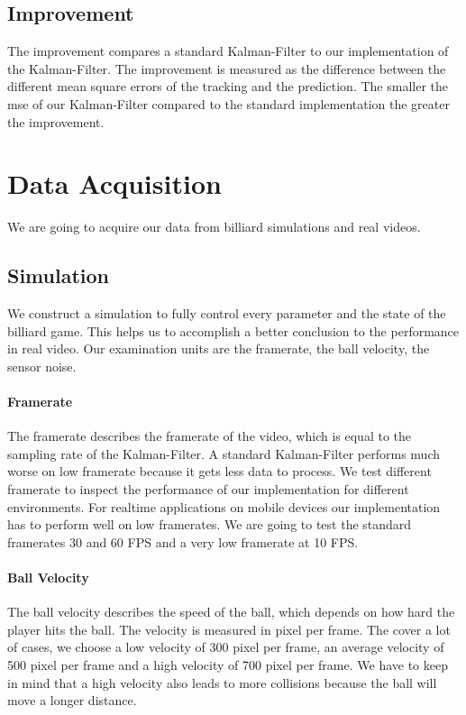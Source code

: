 \documentclass[titlepage, a4paper, 11pt]{scrartcl}
\begin{document}
\subsection{Improvement}

The improvement compares a standard Kalman-Filter to our implementation of the Kalman-Filter.
The improvement is measured as the difference between the different mean square errors of the tracking and the prediction.
The smaller the mse of our Kalman-Filter compared to the standard implementation the greater the improvement.

\section{Data Acquisition} \label{data}

We are going to acquire our data from billiard simulations and real videos.

\subsection{Simulation} \label{sim}

We construct a simulation to fully control every parameter and the state of the billiard game.
This helps us to accomplish a better conclusion to the performance in real video.
Our examination units are the framerate, the ball velocity, the sensor noise.

\paragraph{Framerate} \label{fps}

The framerate describes the framerate of the video, which is equal to the sampling rate of the Kalman-Filter.
A standard Kalman-Filter performs much worse on low framerate because it gets less data to process.
We test different framerate to inspect the performance of our implementation for different environments.
For realtime applications on mobile devices our implementation has to perform well on low framerates.
We are going to test the standard framerates 30 and 60 FPS and a very low framerate at 10 FPS.

\paragraph{Ball Velocity}

The ball velocity describes the speed of the ball, which depends on how hard the player hits the ball.
The velocity is measured in pixel per frame.
The cover a lot of cases, we choose a low velocity of 300 pixel per frame, an average velocity of 500 pixel per frame and a high velocity of 700 pixel per frame.
We have to keep in mind that a high velocity also leads to more collisions because the ball will move a longer distance.
\end{document}

